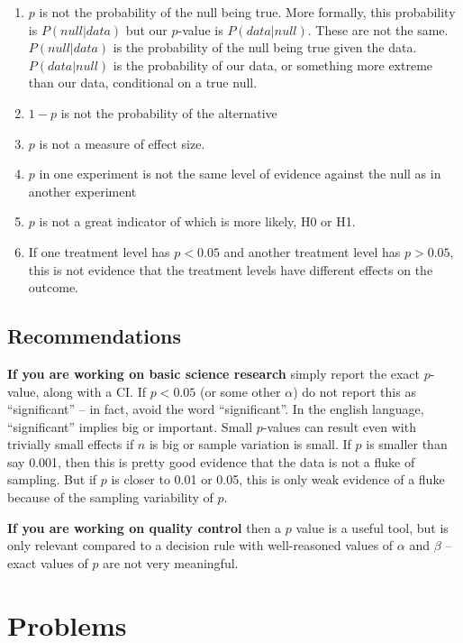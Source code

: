 \documentclass[]{book}
\providecommand{\tightlist}{%
  \setlength{\itemsep}{0pt}\setlength{\parskip}{0pt}}
\begin{document}
\begin{enumerate}
\def\labelenumi{\arabic{enumi}.}
\tightlist
\item
  \(p\) is not the probability of the null being true. More formally,
  this probability is \(P(null | data)\) but our \(p\)-value is
  \(P(data | null)\). These are not the same. \(P(null | data)\) is the
  probability of the null being true given the data. \(P(data | null)\)
  is the probability of our data, or something more extreme than our
  data, conditional on a true null.
\item
  \(1-p\) is not the probability of the alternative
\item
  \(p\) is not a measure of effect size.
\item
  \(p\) in one experiment is not the same level of evidence against the
  null as in another experiment
\item
  \(p\) is not a great indicator of which is more likely, H0 or H1.
\item
  If one treatment level has \(p < 0.05\) and another treatment level
  has \(p > 0.05\), this is not evidence that the treatment levels have
  different effects on the outcome.
\end{enumerate}

\subsection{Recommendations}\label{recommendations}

\textbf{If you are working on basic science research} simply report the
exact \(p\)-value, along with a CI. If \(p < 0.05\) (or some other
\(\alpha\)) do not report this as ``significant'' -- in fact, avoid the
word ``significant''. In the english language, ``significant'' implies
big or important. Small \(p\)-values can result even with trivially
small effects if \(n\) is big or sample variation is small. If \(p\) is
smaller than say 0.001, then this is pretty good evidence that the data
is not a fluke of sampling. But if \(p\) is closer to 0.01 or 0.05, this
is only weak evidence of a fluke because of the sampling variability of
\(p\).

\textbf{If you are working on quality control} then a \(p\) value is a
useful tool, but is only relevant compared to a decision rule with
well-reasoned values of \(\alpha\) and \(\beta\) -- exact values of
\(p\) are not very meaningful.

\section{Problems}\label{problems-2}
\end{document}
